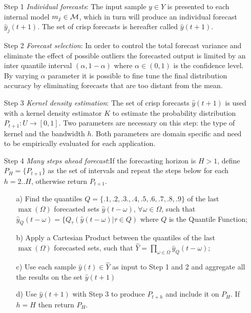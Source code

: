 \begin{enumerate}

\item[Step 1] \textit{Individual forecasts}: The input sample $y \in Y$ is presented to each internal model $m_j \in \mathcal{M}$, which in turn will produce an individual forecast $\hat{y}_j(t+1)$. The set of crisp forecasts is hereafter called $\hat{y}(t+1)$.

\item[Step 2] \textit{Forecast selection}: In order to control the total forecast variance and eliminate the effect of possible outliers the forecasted output is limited by an inter quantile interval $(\alpha, 1-\alpha)$ where $\alpha \in (0,1)$ is the confidence level. By varying $\alpha$ parameter it is possible to fine tune the final distribution accuracy by eliminating forecasts that are too distant from the mean.

\item[Step 3] \textit{Kernel density estimation}: The set of crisp forecasts $\hat{y}(t+1)$ is used with a kernel density estimator $K$ to estimate the probability distribution $P_{t+1}: U \rightarrow [0,1]$. Two parameters are necessary on this step: the type of kernel and the bandwidth $h$. Both parameters are domain specific and need to be empirically evaluated for each application.

\item[Step 4] \textit{Many steps ahead forecast}:If the forecasting horizon is $H > 1$, define $P_H = \{P_{t+1}\}$ as the set of intervals and repeat the steps below for each $h=2..H$, otherwise return  $P_{t+1}$.
\begin{enumerate}
    \item[a)]  Find the quantiles $Q = \{.1, .2, .3., .4, .5, .6, .7, .8, .9\}$ of the last $\max(\Omega)$ forecasted sets $\hat{y}(t-\omega)$, $\forall \omega \in \Omega$, such that $\hat{y}_Q(t-\omega) = \{ Q_\tau(\hat{y}(t-\omega) | \tau \in Q)$ where $Q$ is the Quantile Function;
    \item[b)] Apply a Cartesian Product between the quantiles of the last $\max(\Omega)$ forecasted sets, such that $\hat{Y} = \prod_{\omega \in \Omega} \hat{y}_Q(t-\omega)$; 
    \item[c)] Use each sample $\hat{y}(t) \in \hat{Y}$ as input to Step 1 and 2 and aggregate all the results on the set $\hat{y}(t+1)$
    \item[d)] Use $\hat{y}(t+1)$ with Step 3 to produce $P_{t+h}$ and include it on $P_H$. If $h=H$ then return $P_H$.
\end{enumerate}

\end{enumerate}

